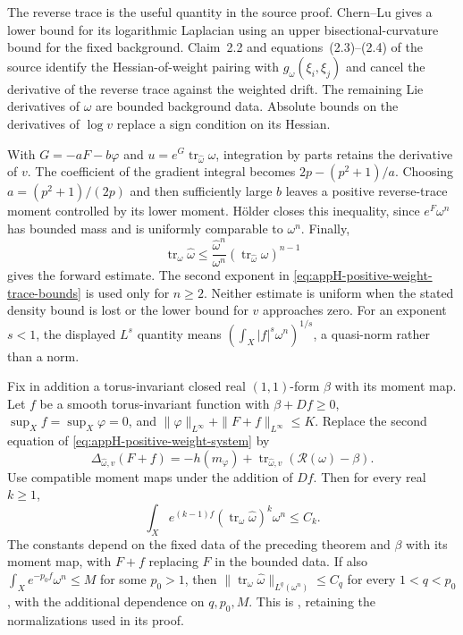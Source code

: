The reverse trace is the useful quantity in the source proof.
Chern--Lu gives a lower bound for its logarithmic Laplacian using an
upper bisectional-curvature bound for the fixed background. Claim~2.2
and equations~(2.3)--(2.4) of the source identify the Hessian-of-weight
pairing with $g_\omega(\xi_i,\xi_j)$ and cancel the derivative of
the reverse trace against the weighted drift. The remaining Lie
derivatives of $\omega$ are bounded background data. Absolute bounds
on the derivatives of $\log v$ replace a sign condition on its Hessian.

With $G=-aF-b\varphi$ and
$u=e^G\operatorname{tr}_{\widehat\omega}\omega$, integration by
parts retains the derivative of $v$. The coefficient of the gradient
integral becomes $2p-(p^2+1)/a$. Choosing
$a=(p^2+1)/(2p)$ and then sufficiently large $b$ leaves a positive
reverse-trace moment controlled by its lower moment. H\"older closes
this inequality, since $e^F\omega^n$ has bounded mass and is
uniformly comparable to $\omega^n$. Finally,
\[
 \operatorname{tr}_\omega\widehat\omega\leq
   \frac{\widehat\omega^n}{\omega^n}
    (\operatorname{tr}_{\widehat\omega}\omega)^{n-1}
 \tag{H.115}\label{eq:appH-weighted-trace-determinant}
\]
gives the forward estimate. The second exponent in
\eqref{eq:appH-positive-weight-trace-bounds} is used only for $n\geq2$.
Neither estimate is uniform when the stated density bound is lost or
the lower bound for $v$ approaches zero.
For an exponent $s<1$, the displayed $L^s$ quantity means
$(\int_X|f|^s\omega^n)^{1/s}$, a quasi-norm rather than a norm.

\begin{theorem}\label{thm:appH-positive-weight-twisted}
Fix in addition a torus-invariant closed real $(1,1)$-form $\beta$
with its moment map. Let $f$ be a smooth torus-invariant function with
$\beta+Df\geq0$, $\sup_X f=\sup_X\varphi=0$, and
$\|\varphi\|_{L^\infty}+\|F+f\|_{L^\infty}\leq K$.
Replace the second equation of
\eqref{eq:appH-positive-weight-system} by
\[
 \Delta_{\widehat\omega,v}(F+f)
   =-h(m_\varphi)+
       \operatorname{tr}_{\widehat\omega,v}
          (\mathcal R(\omega)-\beta).
 \tag{H.116}\label{eq:appH-positive-weight-twisted-system}
\]
Use compatible moment maps under the addition of $Df$.
Then for every real $k\geq1$,
\[
 \int_X e^{(k-1)f}
       (\operatorname{tr}_\omega\widehat\omega)^k\omega^n\leq C_k.
 \tag{H.117}\label{eq:appH-positive-weight-twisted-moment}
\]
The constants depend on the fixed data of the preceding theorem and
$\beta$ with its moment map, with $F+f$ replacing $F$ in the bounded
data. If also $\int_Xe^{-p_0f}\omega^n\leq M$ for some $p_0>1$,
then
$\|\operatorname{tr}_\omega\widehat\omega\|_{L^q(\omega^n)}\leq C_q$
for every $1<q<p_0$, with the additional dependence on $q,p_0,M$.
This is \cite[Theorem~2.3]{JubertPan26PositiveWeightsV1}, retaining
the normalizations used in its proof.
\end{theorem}

